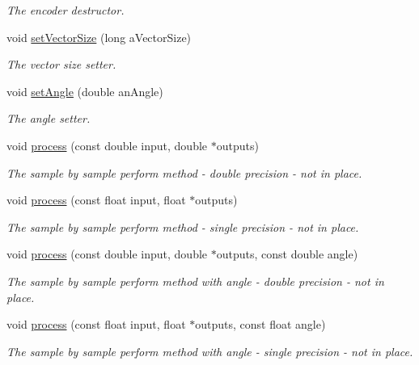 \begin{DoxyCompactItemize}
\begin{DoxyCompactList}\small\item\em The encoder destructor. \end{DoxyCompactList}\item 
void \hyperlink{class_ambisonic_encoder_a7219775383a3bead41ec7f1a609a76fe}{set\-Vector\-Size} (long a\-Vector\-Size)
\begin{DoxyCompactList}\small\item\em The vector size setter. \end{DoxyCompactList}\item 
void \hyperlink{class_ambisonic_encoder_a1939dfd1305bd3b9387c7bf91b230e35}{set\-Angle} (double an\-Angle)
\begin{DoxyCompactList}\small\item\em The angle setter. \end{DoxyCompactList}\item 
void \hyperlink{class_ambisonic_encoder_a62b6e35d4e281d2f405a03c20a64ca90}{process} (const double input, double $\ast$outputs)
\begin{DoxyCompactList}\small\item\em The sample by sample perform method -\/ double precision -\/ not in place. \end{DoxyCompactList}\item 
void \hyperlink{class_ambisonic_encoder_a06fcd9168c9576c6c73f9bf81019af54}{process} (const float input, float $\ast$outputs)
\begin{DoxyCompactList}\small\item\em The sample by sample perform method -\/ single precision -\/ not in place. \end{DoxyCompactList}\item 
void \hyperlink{class_ambisonic_encoder_a6c8dcafeb8647c15d18fafa71cf52ad7}{process} (const double input, double $\ast$outputs, const double angle)
\begin{DoxyCompactList}\small\item\em The sample by sample perform method with angle -\/ double precision -\/ not in place. \end{DoxyCompactList}\item 
void \hyperlink{class_ambisonic_encoder_a70e57ebbe763cbca011164bc83884dcd}{process} (const float input, float $\ast$outputs, const float angle)
\begin{DoxyCompactList}\small\item\em The sample by sample perform method with angle -\/ single precision -\/ not in place. \end{DoxyCompactList}\item 

\end{DoxyCompactItemize}
